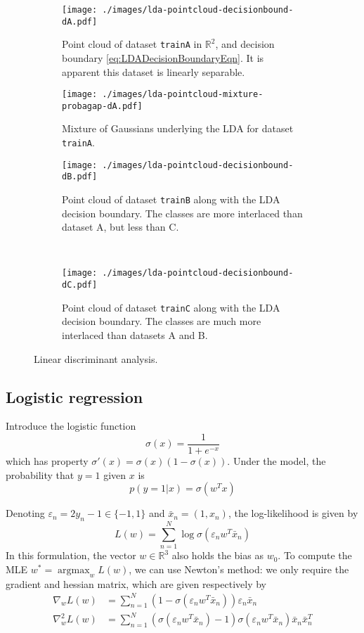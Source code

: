 \documentclass[11pt]{article}
\newcommand\RR{\mathbb{R}}
\renewcommand{\epsilon}{\varepsilon}
\DeclareMathOperator*{\argmax}{\mathrm{argmax}}
\begin{document}
\begin{figure}
	\centering
	\begin{subfigure}[t]{.64\linewidth}
	\texttt{[image: ./images/lda-pointcloud-decisionbound-dA.pdf]}
	\caption{Point cloud of dataset \texttt{trainA} in $\RR^2$, and decision boundary \eqref{eq:LDADecisionBoundaryEqn}. It is apparent this dataset is linearly separable.}
	\label{fig:LDAboundaryPlot}
	\end{subfigure}
	\begin{subfigure}[t]{.64\linewidth}
	\texttt{[image: ./images/lda-pointcloud-mixture-probagap-dA.pdf]}
	\caption{Mixture of Gaussians underlying the LDA for dataset \texttt{trainA}.}
	\end{subfigure}
	\begin{subfigure}[t]{.49\linewidth}
	\texttt{[image: ./images/lda-pointcloud-decisionbound-dB.pdf]}
	\caption{Point cloud of dataset \texttt{trainB} along with the LDA decision boundary. The classes are more interlaced than dataset A, but less than C.}\label{fig:LDAdataB}
	\end{subfigure}~
	\begin{subfigure}[t]{.49\linewidth}
	\texttt{[image: ./images/lda-pointcloud-decisionbound-dC.pdf]}
	\caption{Point cloud of dataset \texttt{trainC} along with the LDA decision boundary. The classes are much more interlaced than datasets A and B.}\label{fig:LDAdataC}
	\end{subfigure}
	\caption{Linear discriminant analysis.}\label{fig:LDAplot}
\end{figure}



\subsection{Logistic regression}

Introduce the logistic function
\[
	\sigma(x) = \frac{1}{1 + e^{-x}}
\]
which has property $\sigma'(x) = \sigma(x)(1-\sigma(x))$. Under the model, the probability that $y=1$ given $x$ is
\[
	p(y=1|x) = \sigma(w^Tx)
\]

Denoting $\epsilon_n = 2y_n - 1 \in \{-1,1\}$ and $\bar{x}_n = (1, x_n)$, the log-likelihood is given by
\begin{equation}
L(w) = \sum_{n=1}^N \log\sigma(\epsilon_n w^T\bar{x}_n)
\end{equation}
In this formulation, the vector $w\in\RR^3$ also holds the bias as $w_0$. To compute the MLE $w^* = \argmax_{w} L(w)$, we can use Newton's method: we only require the gradient and hessian matrix, which are given respectively by
\begin{align}
\nabla_w L(w) &=
\sum_{n=1}^N \left(1 - \sigma(\epsilon_n w^T\bar{x}_n)\right) \epsilon_n \bar{x}_n \\
\nabla_w^2 L(w) &=
\sum_{n=1}^N (\sigma(\epsilon_nw^T\bar{x}_n)-1)\sigma(\epsilon_nw^T\bar{x}_n) \bar{x}_n \bar{x}_n^T
\end{align}
\end{document}
